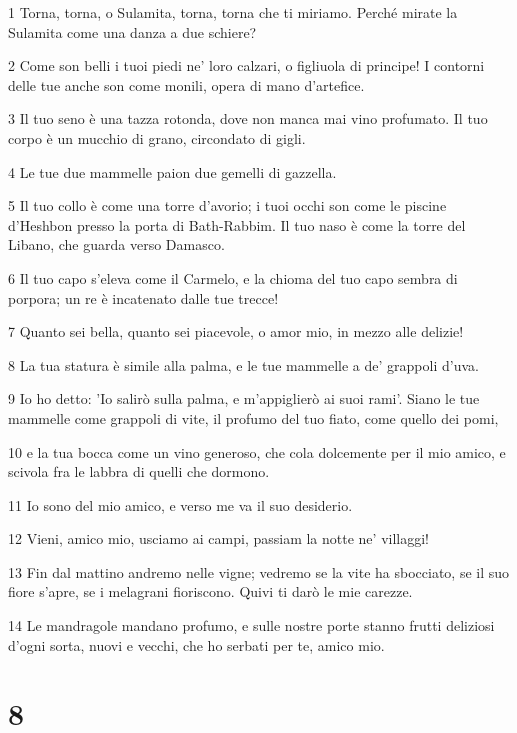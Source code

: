 \par 1 Torna, torna, o Sulamita, torna, torna che ti miriamo. Perché mirate la Sulamita come una danza a due schiere?
\par 2 Come son belli i tuoi piedi ne' loro calzari, o figliuola di principe! I contorni delle tue anche son come monili, opera di mano d'artefice.
\par 3 Il tuo seno è una tazza rotonda, dove non manca mai vino profumato. Il tuo corpo è un mucchio di grano, circondato di gigli.
\par 4 Le tue due mammelle paion due gemelli di gazzella.
\par 5 Il tuo collo è come una torre d'avorio; i tuoi occhi son come le piscine d'Heshbon presso la porta di Bath-Rabbim. Il tuo naso è come la torre del Libano, che guarda verso Damasco.
\par 6 Il tuo capo s'eleva come il Carmelo, e la chioma del tuo capo sembra di porpora; un re è incatenato dalle tue trecce!
\par 7 Quanto sei bella, quanto sei piacevole, o amor mio, in mezzo alle delizie!
\par 8 La tua statura è simile alla palma, e le tue mammelle a de' grappoli d'uva.
\par 9 Io ho detto: 'Io salirò sulla palma, e m'appiglierò ai suoi rami'. Siano le tue mammelle come grappoli di vite, il profumo del tuo fiato, come quello dei pomi,
\par 10 e la tua bocca come un vino generoso, che cola dolcemente per il mio amico, e scivola fra le labbra di quelli che dormono.
\par 11 Io sono del mio amico, e verso me va il suo desiderio.
\par 12 Vieni, amico mio, usciamo ai campi, passiam la notte ne' villaggi!
\par 13 Fin dal mattino andremo nelle vigne; vedremo se la vite ha sbocciato, se il suo fiore s'apre, se i melagrani fioriscono. Quivi ti darò le mie carezze.
\par 14 Le mandragole mandano profumo, e sulle nostre porte stanno frutti deliziosi d'ogni sorta, nuovi e vecchi, che ho serbati per te, amico mio.

\chapter{8}


